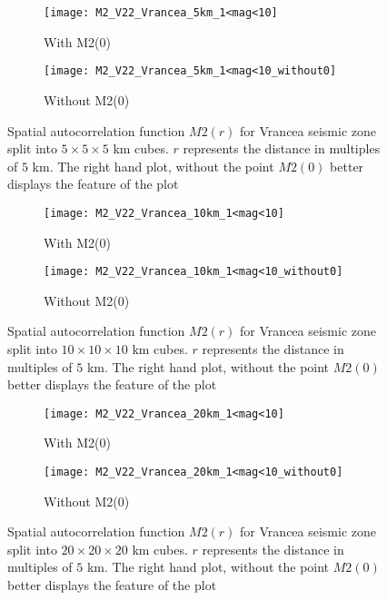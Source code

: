 \begin{figure}[!ht]
\begin{subfigure}{.5\textwidth}
  \centering
  \texttt{[image: M2\_V22\_Vrancea\_5km\_1<mag<10]}
  \caption{With M2(0)}
  \label{fig:corr5km}
\end{subfigure}%
\begin{subfigure}{.5\textwidth}
  \centering
  \texttt{[image: M2\_V22\_Vrancea\_5km\_1<mag<10\_without0]}
  \caption{Without M2(0)}
  \label{fig:corr5km_noZero}
\end{subfigure}
\caption{Spatial autocorrelation function $M2(r)$ for Vrancea seismic zone split into $5\times5\times5$ km cubes. $r$ represents the distance in multiples of $5$ km. The right hand plot, without the point $M2(0)$ better displays the feature of the plot}
\label{fig:spcorrVrancea5km}
\end{figure}

\begin{figure}[!ht]
\begin{subfigure}{.5\textwidth}
  \centering
  \texttt{[image: M2\_V22\_Vrancea\_10km\_1<mag<10]}
  \caption{With M2(0)}
  \label{fig:corr10km}
\end{subfigure}%
\begin{subfigure}{.5\textwidth}
  \centering
  \texttt{[image: M2\_V22\_Vrancea\_10km\_1<mag<10\_without0]}
  \caption{Without M2(0)}
  \label{fig:corr10km_noZero}
\end{subfigure}
\caption{Spatial autocorrelation function $M2(r)$ for Vrancea seismic zone split into $10\times10\times10$ km cubes. $r$ represents the distance in multiples of $5$ km. The right hand plot, without the point $M2(0)$ better displays the feature of the plot}
\label{fig:spcorrVrancea10km}
\end{figure}

\begin{figure}[!ht]
\begin{subfigure}{.5\textwidth}
  \centering
  \texttt{[image: M2\_V22\_Vrancea\_20km\_1<mag<10]}
  \caption{With M2(0)}
  \label{fig:corr20km}
\end{subfigure}%
\begin{subfigure}{.5\textwidth}
  \centering
  \texttt{[image: M2\_V22\_Vrancea\_20km\_1<mag<10\_without0]}
  \caption{Without M2(0)}
  \label{fig:corr20km_noZero}
\end{subfigure}
\caption{Spatial autocorrelation function $M2(r)$ for Vrancea seismic zone split into $20\times20\times20$ km cubes. $r$ represents the distance in multiples of $5$ km. The right hand plot, without the point $M2(0)$ better displays the feature of the plot}
\label{fig:spcorrVrancea20km}
\end{figure}



